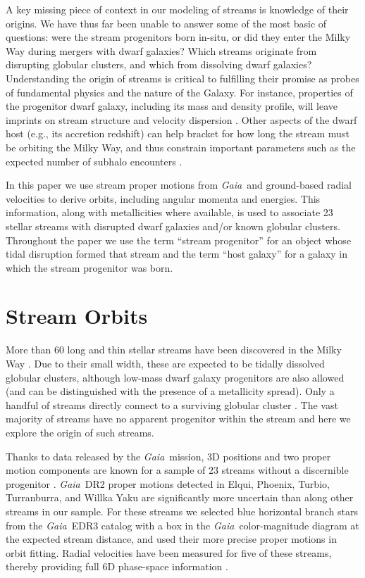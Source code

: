 \documentclass[twocolumn]{aastex63}
\newcommand{\gaia}{\textsl{Gaia}}
\begin{document}
A key missing piece of context in our modeling of streams is knowledge of their origins. 
We have thus far been unable to answer some of the most basic of questions: were the stream progenitors born in-situ, or did they enter the Milky Way during mergers with dwarf galaxies?
Which streams originate from disrupting globular clusters, and which from dissolving dwarf galaxies?
Understanding the origin of streams is critical to fulfilling their promise as probes of fundamental physics and the nature of the Galaxy.
For instance, properties of the progenitor dwarf galaxy, including its mass and density profile, will leave imprints on stream structure and velocity dispersion \citep[][]{carlberg2018, malhan2020}.
Other aspects of the dwarf host (e.g., its accretion redshift) can help bracket for how long the stream must be orbiting the Milky Way, and thus constrain important parameters such as the expected number of subhalo encounters \citep[e.g.,][]{erkal2016}.

In this paper we use stream proper motions from \gaia\ and ground-based radial velocities to derive orbits, including angular momenta and energies.
This information, along with metallicities where available, is used to associate 23 stellar streams with disrupted dwarf galaxies and/or known globular clusters.
Throughout the paper we use the term ``stream progenitor'' for an object whose tidal disruption formed that stream and the term ``host galaxy'' for a galaxy in which the stream progenitor was born.


\section{Stream Orbits}
\label{sec:streamorbits}
More than 60 long and thin stellar streams have been discovered in the Milky Way \citep[see][for an up-to-date catalog]{mateu2018}.
Due to their small width, these are expected to be tidally dissolved globular clusters, although low-mass dwarf galaxy progenitors are also allowed (and can be distinguished with the presence of a metallicity spread).
Only a handful of streams directly connect to a surviving globular cluster \citep[e.g.,][]{rockosi2002, grillmair2006b}.
The vast majority of streams have no apparent progenitor within the stream and here we explore the origin of such streams.

Thanks to data released by the \gaia\ mission, 3D positions and two proper motion components are known for a sample of 23 streams without a discernible progenitor \citep{ibata2019, shipp2019, riley2020}.
\gaia\ DR2 proper motions detected in Elqui, Phoenix, Turbio, Turranburra, and Willka Yaku are significantly more uncertain than along other streams in our sample.
For these streams we selected blue horizontal branch stars from the \gaia\ EDR3 catalog \citep{gaiaedr3} with a box in the \gaia\ color-magnitude diagram at the expected stream distance, and used their more precise proper motions in orbit fitting.
Radial velocities have been measured for five of these streams, thereby providing full 6D phase-space information \citep{caldwell2020, li2020, bonaca2020b}.
\end{document}
